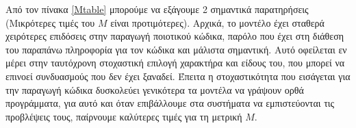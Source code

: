 Από τον πίνακα \ref{Mtable} μπορούμε να εξάγουμε 2 σημαντικά παρατηρήσεις (Μικρότερες τιμές του $M$ είναι προτιμότερες).
Αρχικά, το μοντέλο  έχει σταθερά χειρότερες επιδόσεις στην παραγωγή ποιοτικού κώδικα, παρόλο που έχει στη διάθεση του παραπάνω πληροφορία για τον κώδικα και μάλιστα σημαντική. Αυτό οφείλεται εν μέρει στην ταυτόχρονη στοχαστική επιλογή χαρακτήρα και είδους του, που μπορεί να επινοεί συνδυασμούς που δεν έχει ξαναδεί. Έπειτα η στοχαστικότητα που εισάγεται για την παραγωγή κώδικα δυσκολεύει γενικότερα τα μοντέλα να γράψουν ορθά προγράμματα, για αυτό και όταν επιβάλλουμε στα συστήματα να εμπιστεύονται τις προβλέψεις τους, παίρνουμε καλύτερες τιμές για τη μετρική $M$.